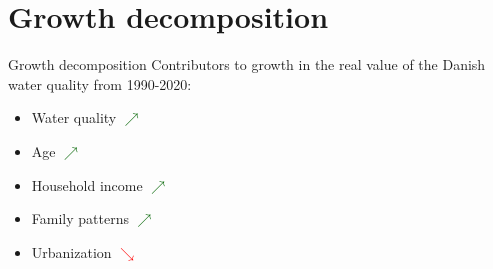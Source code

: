 \section{Growth decomposition}

\begin{frame}{Growth decomposition}
  Contributors to growth in the real value of the Danish water quality from 1990-2020:
  \begin{itemize}
    \item Water quality \textcolor{darkgreen}{$\nearrow$}
    \item Age \textcolor{darkgreen}{$\nearrow$}
    \item Household income \textcolor{darkgreen}{$\nearrow$}
    \item Family patterns \textcolor{darkgreen}{$\nearrow$}
    \item Urbanization \textcolor{red}{$\searrow$}
  \end{itemize}
\end{frame}